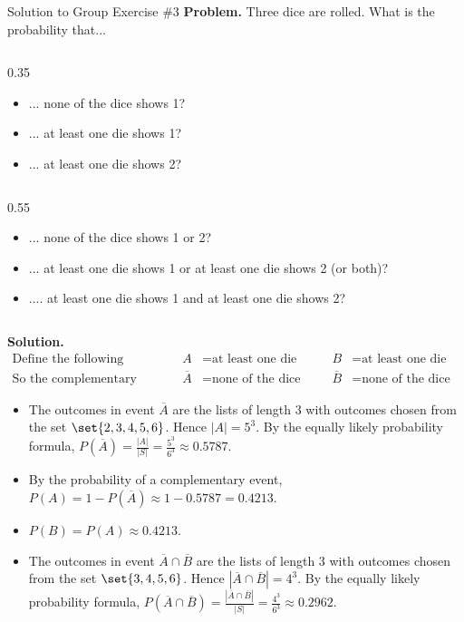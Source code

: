 \documentclass[10pt]{beamer}
\begin{document}
\begin{frame}{Solution to Group Exercise \#3}
\scriptsize 
 \colorbox{blue!30}{\textbf{Problem.}} Three dice are rolled.  What is the probability that...
    \begin{columnsonlytextwidth}
    \begin{column}{0.35\textwidth}
        \begin{itemize} \tiny 
		\item[a.)] ... none of the dice shows 1? 
		\item[b.)] ... at least one die shows 1? 
		\item[c.)] ... at least one die shows 2?
        \end{itemize}
    \end{column}
    \begin{column}{0.55\textwidth}
        \begin{itemize}  \tiny 
		\item[d.)] ... none of the dice shows 1 or 2?
		\item[e.)]  ... at least one die shows 1 or at least one die shows 2 (or both)? 
		\item[f.)] .... at least one die shows 1 and at least one die shows 2?
        \end{itemize}
    \end{column}
    \end{columnsonlytextwidth}
 \vfill 
  \colorbox{green!30}{\textbf{Solution.}}  
\begin{align*}
\text{Define the following events} &&  A &= \text{at least one die shows 1} &\quad  B &= \text{at least one die shows 2} \\
 \text{So the complementary events are}&&  \overline{A} &= \text{none of the dice show 1} &\quad   \overline{B} &= \text{none of the dice show 2}
\end{align*}
%
\vspace{-.5cm}
 \begin{itemize}
\item[a.)]  The outcomes in event $\overline{A}$ are the lists of length 3 with outcomes chosen from the set $\set{2,3,4,5,6}$.  Hence $|A| = 5^3$. By the equally likely probability formula,  $P(\overline{A}) = \frac{|A|}{|S|} = \frac{5^3}{6^3} \approx  0.5787$.   
\item[b.)] By the probability of a complementary event, $P(A) =  1- P(\overline{A}) \approx 1-0.5787 = 0.4213$. 
\item[c.)] $P(B) = P(A) \approx 0.4213$.
\item[d.)] The outcomes in event $\overline{A} \cap \overline{B}$ are the lists of length 3 with outcomes chosen from the set $\set{3,4,5,6}$.   Hence $|\overline{A} \cap \overline{B}| = 4^3$. By the equally likely probability formula,  $P(\overline{A} \cap \overline{B}) = \frac{|\overline{A} \cap \overline{B}|}{|S|} = \frac{4^3}{6^3} \approx  0.2962$. 

\end{itemize}
\end{frame}
\end{document}

